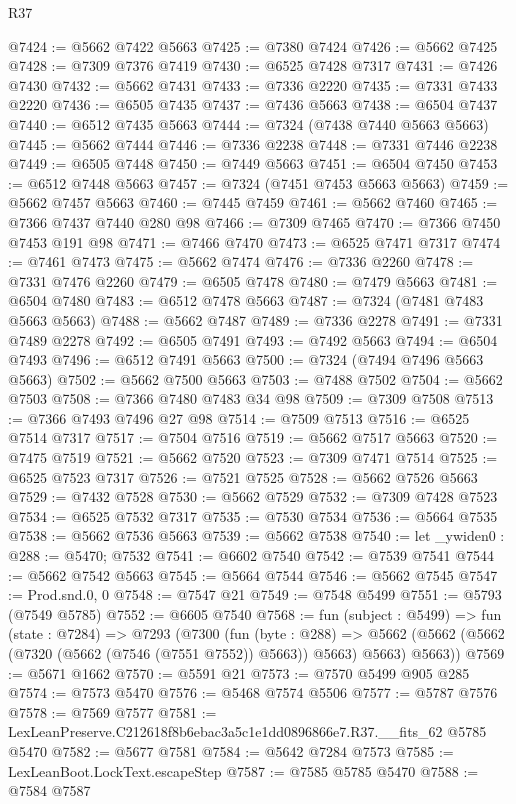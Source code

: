 \begin{lexlean}{R37}
\begin{coremodule}
@7424 := @5662 @7422 @5663
@7425 := @7380 @7424
@7426 := @5662 @7425
@7428 := @7309 @7376 @7419
@7430 := @6525 @7428 @7317
@7431 := @7426 @7430
@7432 := @5662 @7431
@7433 := @7336 @2220
@7435 := @7331 @7433 @2220
@7436 := @6505 @7435
@7437 := @7436 @5663
@7438 := @6504 @7437
@7440 := @6512 @7435 @5663
@7444 := @7324 (@7438 @7440 @5663 @5663)
@7445 := @5662 @7444
@7446 := @7336 @2238
@7448 := @7331 @7446 @2238
@7449 := @6505 @7448
@7450 := @7449 @5663
@7451 := @6504 @7450
@7453 := @6512 @7448 @5663
@7457 := @7324 (@7451 @7453 @5663 @5663)
@7459 := @5662 @7457 @5663
@7460 := @7445 @7459
@7461 := @5662 @7460
@7465 := @7366 @7437 @7440 @280 @98
@7466 := @7309 @7465
@7470 := @7366 @7450 @7453 @191 @98
@7471 := @7466 @7470
@7473 := @6525 @7471 @7317
@7474 := @7461 @7473
@7475 := @5662 @7474
@7476 := @7336 @2260
@7478 := @7331 @7476 @2260
@7479 := @6505 @7478
@7480 := @7479 @5663
@7481 := @6504 @7480
@7483 := @6512 @7478 @5663
@7487 := @7324 (@7481 @7483 @5663 @5663)
@7488 := @5662 @7487
@7489 := @7336 @2278
@7491 := @7331 @7489 @2278
@7492 := @6505 @7491
@7493 := @7492 @5663
@7494 := @6504 @7493
@7496 := @6512 @7491 @5663
@7500 := @7324 (@7494 @7496 @5663 @5663)
@7502 := @5662 @7500 @5663
@7503 := @7488 @7502
@7504 := @5662 @7503
@7508 := @7366 @7480 @7483 @34 @98
@7509 := @7309 @7508
@7513 := @7366 @7493 @7496 @27 @98
@7514 := @7509 @7513
@7516 := @6525 @7514 @7317
@7517 := @7504 @7516
@7519 := @5662 @7517 @5663
@7520 := @7475 @7519
@7521 := @5662 @7520
@7523 := @7309 @7471 @7514
@7525 := @6525 @7523 @7317
@7526 := @7521 @7525
@7528 := @5662 @7526 @5663
@7529 := @7432 @7528
@7530 := @5662 @7529
@7532 := @7309 @7428 @7523
@7534 := @6525 @7532 @7317
@7535 := @7530 @7534
@7536 := @5664 @7535
@7538 := @5662 @7536 @5663
@7539 := @5662 @7538
@7540 := let _ywiden0 : @288 := @5470; @7532
@7541 := @6602 @7540
@7542 := @7539 @7541
@7544 := @5662 @7542 @5663
@7545 := @5664 @7544
@7546 := @5662 @7545
@7547 := Prod.snd.{0, 0}
@7548 := @7547 @21
@7549 := @7548 @5499
@7551 := @5793 (@7549 @5785)
@7552 := @6605 @7540
@7568 := fun (subject : @5499) =>
  fun (state : @7284) =>
  @7293
    (@7300
      (fun (byte : @288) =>
      @5662 (@5662 (@5662 (@7320 (@5662 (@7546 (@7551 @7552)) @5663)) @5663) @5663) @5663))
@7569 := @5671 @1662
@7570 := @5591 @21
@7573 := @7570 @5499 @905 @285
@7574 := @7573 @5470
@7576 := @5468 @7574 @5506
@7577 := @5787 @7576
@7578 := @7569 @7577
@7581 := LexLeanPreserve.C212618f8b6ebac3a5c1e1dd0896866e7.R37.__fits_62 @5785 @5470
@7582 := @5677 @7581
@7584 := @5642 @7284 @7573
@7585 := LexLeanBoot.LockText.escapeStep
@7587 := @7585 @5785 @5470
@7588 := @7584 @7587

\end{coremodule}
\end{lexlean}
